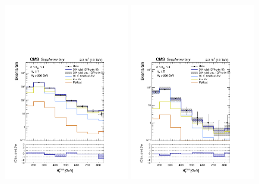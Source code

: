 \clearpage
\begin{figure}[!h]
  \begin{center}
    \includegraphics[width=0.49\textwidth]{Supplementary/aggregated_mhtShape_le1b_ge3j_200_Inf_crfit_aux.pdf} 
    \includegraphics[width=0.49\textwidth]{Supplementary/aggregated_mhtShape_ge2b_ge3j_200_Inf_crfit_aux.pdf} \\
    \caption{
      \label{fig:aggr_mid} 
    }
  \end{center}
\end{figure}

